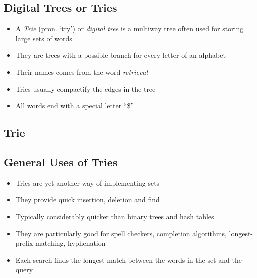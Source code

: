 \begin{slide}
\section[-1]{Digital Trees or Tries}

\begin{PauseHighLight}
  \begin{itemize}
  \item A \emph{Trie} (pron. `try') or \emph{digital tree} is a multiway
    tree often used for storing large sets of words\pause
  \item They are trees with a possible branch for every letter of an
    alphabet\pause
  \item Their names comes from the word \textit{re\emph{trie}val}\pause
  \item Tries usually compactify the edges in the tree\pause
  \item All words end with a special letter ``\$''\pause
  \end{itemize}
\end{PauseHighLight}

\end{slide}



\begin{slide}
\section[-1]{Trie}
\pause
\pb
{}
\begin{center}
  \pause
\end{center}

\end{slide}



\begin{slide}
\section{General Uses of Tries}

\begin{PauseHighLight}
  \begin{itemize}
  \item Tries are yet another way of implementing sets\pause
  \item They provide quick insertion, deletion and find\pause
  \item Typically considerably quicker than binary trees and hash
    tables\pause
  \item They are particularly good for spell checkers, completion
    algorithms, longest-prefix matching, hyphenation\pause
  \item Each search finds the longest match between the words in the set
    and the query\pause
  \end{itemize}
\end{PauseHighLight}

\end{slide}

